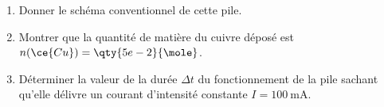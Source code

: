\begin{enumerate}
    \item Donner le schéma conventionnel de cette pile.
    \item Montrer que la quantité de matière du cuivre déposé est
          $n(\ce{Cu})=\qty{5e-2}{\mole}$.
    \item Déterminer la valeur de la durée $\Delta t$ du fonctionnement de la
          pile sachant qu'elle délivre un courant d'intensité constante
          $I=\qty{100}{\mA}$.
\end{enumerate}

